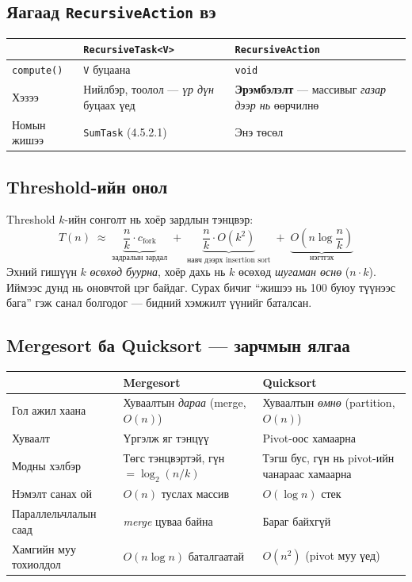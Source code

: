 \documentclass[11pt,a4paper]{article}
\begin{document}
\subsection{Яагаад \texttt{RecursiveAction} вэ}
\begin{center}
\small
\begin{tabular}{lL{5.0cm}L{6.4cm}}
\toprule
& \texttt{RecursiveTask<V>} & \texttt{RecursiveAction} \\
\midrule
\texttt{compute()} & \texttt{V} буцаана & \texttt{void} \\
Хэзээ & Нийлбэр, тоолол --- \emph{үр дүн} буцаах үед &
\textbf{Эрэмбэлэлт} --- массивыг \emph{газар дээр нь} өөрчилнө \\
Номын жишээ & \texttt{SumTask} (4.5.2.1) & Энэ төсөл \\
\bottomrule
\end{tabular}
\end{center}

\subsection{Threshold-ийн онол}
Threshold $k$-ийн сонголт нь хоёр зардлын тэнцвэр:
\[
T(n) \;\approx\; \underbrace{\frac{n}{k}\cdot c_{\text{fork}}}_{\text{задралын зардал}}
\;+\; \underbrace{\frac{n}{k}\cdot O(k^2)}_{\text{навч дээрх insertion sort}}
\;+\; \underbrace{O(n\log\frac{n}{k})}_{\text{нэгтгэх}}
\]
Эхний гишүүн $k$ \emph{өсөхөд буурна}, хоёр дахь нь $k$ өсөхөд \emph{шугаман
өснө} ($n\cdot k$). Иймээс дунд нь оновчтой цэг байдаг. Сурах бичиг
``жишээ нь 100 буюу түүнээс бага'' гэж санал болгодог --- бидний хэмжилт
үүнийг баталсан.

\subsection{Mergesort ба Quicksort --- зарчмын ялгаа}
\begin{center}
\small
\begin{tabular}{L{3.0cm}L{5.6cm}L{5.6cm}}
\toprule
& \textbf{Mergesort} & \textbf{Quicksort} \\
\midrule
Гол ажил хаана & Хуваалтын \emph{дараа} (merge, $O(n)$) &
Хуваалтын \emph{өмнө} (partition, $O(n)$) \\
Хуваалт & Үргэлж яг тэнцүү & Pivot-оос хамаарна \\
Модны хэлбэр & Төгс тэнцвэртэй, гүн $=\log_2(n/k)$ & Тэгш бус, гүн нь
pivot-ийн чанараас хамаарна \\
Нэмэлт санах ой & $O(n)$ туслах массив & $O(\log n)$ стек \\
Параллельчлалын саад & \emph{merge} цуваа байна & Бараг байхгүй \\
Хамгийн муу тохиолдол & $O(n\log n)$ баталгаатай & $O(n^2)$ (pivot муу үед) \\
\bottomrule
\end{tabular}
\end{center}
\end{document}
